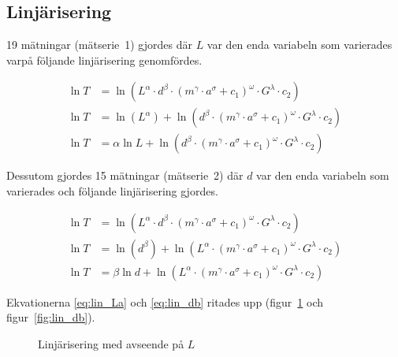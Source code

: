 \documentclass[a4paper,12pt]{article}
\begin{document}
\subsection{Linjärisering}

19 mätningar (mätserie~1) gjordes där $L$ var den enda variabeln som varierades
varpå följande linjärisering genomfördes.

\begin{align}
  \ln T &= \ln (L^\alpha \cdot d^\beta \cdot (m^\gamma \cdot a^\sigma + c_1)^\omega \cdot G^\lambda \cdot c_2) \nonumber \\
  \ln T &= \ln (L^\alpha) + \ln (d^\beta \cdot (m^\gamma \cdot a^\sigma + c_1)^\omega \cdot G^\lambda \cdot c_2) \nonumber \\
  \ln T &= \alpha \ln L + \ln (d^\beta \cdot (m^\gamma \cdot a^\sigma + c_1)^\omega \cdot G^\lambda \cdot c_2)  \label{eq:lin_La}
\end{align}

Dessutom gjordes 15 mätningar (mätserie~2) där $d$ var den enda variabeln som
varierades och följande linjärisering gjordes.

\begin{align}
  \ln T &= \ln (L^\alpha \cdot d^\beta \cdot (m^\gamma \cdot a^\sigma + c_1)^\omega \cdot G^\lambda \cdot c_2) \nonumber \\
  \ln T &= \ln (d^\beta) + \ln (L^\alpha \cdot (m^\gamma \cdot a^\sigma + c_1)^\omega \cdot G^\lambda \cdot c_2) \nonumber \\
  \ln T &= \beta\ln d + \ln (L^\alpha \cdot (m^\gamma \cdot a^\sigma + c_1)^\omega \cdot G^\lambda \cdot c_2)  \label{eq:lin_db}
\end{align}

Ekvationerna \eqref{eq:lin_La} och \eqref{eq:lin_db} ritades upp
(figur~\ref{fig:lin_La} och figur~\ref{fig:lin_db}).

\begin{figure}
  \caption{Linjärisering med avseende på $L$}
  \label{fig:lin_La}
\end{figure}
\end{document}
